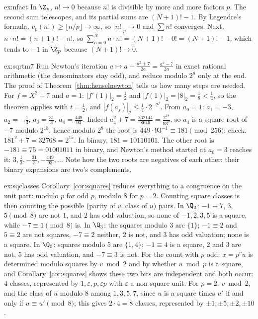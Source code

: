 \begin{solution}{ex:nfact}
\idea In $\Z_p$, $n!\to0$ because $n!$ is divisible by more and more factors $p$. The second sum telescopes, and its partial sums are $(N+1)!-1$.
\writeup By Legendre's formula, $v_p(n!)\ge\lfloor n/p\rfloor\to\infty$, so $|n!|_p\to0$ and $\sum n!$ converges. Next, $n\cdot n!=(n+1)!-n!$, so $\sum_{n=0}^Nn\cdot n!=(N+1)!-0!=(N+1)!-1$, which tends to $-1$ in $\Z_p$ because $(N+1)!\to0$.
\end{solution}

\begin{solution}{ex:sqrtm7}
\idea Run Newton's iteration $a\mapsto a-\frac{a^2+7}{2a}=\frac{a^2-7}{2a}$ in exact rational arithmetic (the denominators stay odd), and reduce modulo $2^8$ only at the end. The proof of Theorem~\ref{thm:henselnewton} tells us how many steps are needed.
\writeup For $f=X^2+7$ and $a=1$: $|f'(1)|_2=\frac12$ and $|f(1)|_2=|8|_2=\frac18<\frac14$, so the theorem applies with $t=\frac12$, and $|f(a_j)|_2\le\frac14\cdot2^{-2^j}$. From $a_0=1$: $a_1=-3$, $a_2=-\frac13$, $a_3=\frac{31}3$, $a_4=\frac{449}{93}$. Indeed $a_4^2+7=\frac{262144}{8649}=\frac{2^{18}}{93^2}$, so $a_4$ is a square root of $-7$ modulo $2^{18}$, hence modulo $2^8$ the root is $449\cdot93^{-1}\equiv181\pmod{256}$; check: $181^2+7=32768=2^{15}$. In binary, $181=10110101$. The other root is $-181\equiv75=01001011$ in binary, and Newton's method started at $a_0=3$ reaches it: $3,\frac13,-\frac{31}3,-\frac{449}{93},\dots$ Note how the two roots are negatives of each other: their binary expansions are two's complements.
\end{solution}

\begin{solution}{ex:sqclasses}
\idea Corollary~\ref{cor:squares} reduces everything to a congruence on the unit part: modulo $p$ for odd $p$, modulo $8$ for $p=2$. Counting square classes is then counting the possible (parity of $v$, class of $u$) pairs.
\writeup In $\Q_2$: $-1\equiv7$, $3$, $5\pmod8$ are not $1$, and $2$ has odd valuation, so none of $-1,2,3,5$ is a square, while $-7\equiv1\pmod8$ is. In $\Q_3$: the squares modulo $3$ are $\{1\}$; $-1\equiv2$ and $5\equiv2$ are not squares, $-7\equiv2$ neither, $2$ is not, and $3$ has odd valuation; none is a square. In $\Q_5$: squares modulo $5$ are $\{1,4\}$; $-1\equiv4$ is a square, $2$ and $3$ are not, $5$ has odd valuation, and $-7\equiv3$ is not. For the count with $p$ odd: $x=p^vu$ is determined modulo squares by $v\bmod2$ and by whether $u\bmod p$ is a square, and Corollary~\ref{cor:squares} shows these two bits are independent and both occur: $4$ classes, represented by $1,\varepsilon,p,\varepsilon p$ with $\varepsilon$ a non-square unit. For $p=2$: $v\bmod2$, and the class of $u$ modulo $8$ among $1,3,5,7$, since $u$ is a square times $u'$ if and only if $u\equiv u'\pmod8$; this gives $2\cdot4=8$ classes, represented by $\pm1,\pm5,\pm2,\pm10$.
\end{solution}

